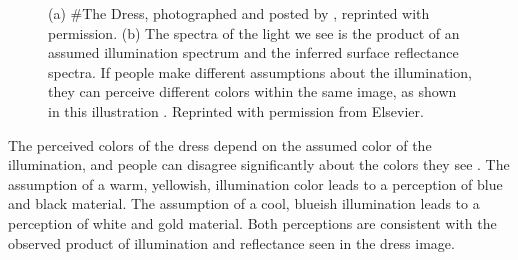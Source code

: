 \begin{figure}[t]
\centerline{
}
\caption{(a) \#The Dress, photographed and posted by \cite{Bleasdale2015}, reprinted with permission.  (b) The spectra of the light we see is the product of an assumed illumination spectrum and the inferred surface reflectance spectra.  If people make different assumptions about the illumination, they can perceive different colors within the same image, as shown in this illustration \cite{Brainard2015}.  Reprinted with permission from Elsevier.
}
\label{fig:thedress}
\end{figure}



The perceived colors of the dress depend on the assumed color of the illumination, and people can disagree significantly about the colors they see \cite{Brainard2015}.  The assumption of a warm, yellowish, illumination color leads to a perception of blue and black material.  The assumption of a cool, blueish illumination leads to a perception of white and gold material.  Both perceptions are consistent with the observed product of illumination and reflectance  seen in the dress image.  

